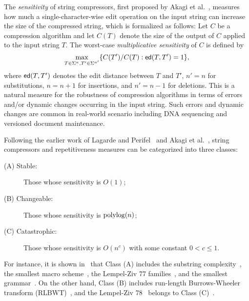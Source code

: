 The \emph{sensitivity} of string compressors,
first proposed by Akagi et al.~\cite{AkagiFI2023},
measures how much a single-character-wise edit operation on the input string
can increase the size of the compressed string,
which is formalized as follows:
Let $C$ be a compression algorithm and let $C(T)$ denote
the size of the output of $C$ applied to the input string $T$.
The worst-case \emph{multiplicative sensitivity} of $C$ 
is defined by
$$\max_{T \in \Sigma^n, T' \in \Sigma^{n'}} \{C(T')/C(T) : \mathsf{ed}(T, T') = 1\},$$
where $\mathsf{ed}(T, T')$ denotes the edit distance between $T$ and $T'$,
$n' = n$ for substitutions, $n = n+1$ for insertions,
and $n' = n-1$ for deletions.
This is a natural measure for the robustness of compression algorithms
in terms of errors and/or dynamic changes occurring in the input string.
Such errors and dynamic changes are common in real-world scenario including
DNA sequencing and versioned document maintenance.

Following the earlier work of Lagarde and Perifel~\cite{LagardeP18}
and Akagi et al.~\cite{AkagiFI2023},
string compressors and repetitiveness measures can be categorized into three classes:
\begin{description}
  \item[(A) Stable:] Those whose sensitivity is $O(1)$;
  \item[(B) Changeable:] Those whose sensitivity is $\mathrm{polylog}(n)$;
  \item[(C) Catastrophic:] Those whose sensitivity is $O(n^c)$ with some constant $0 < c \leq 1$.
    
\end{description}
For instance, it is shown in~\cite{AkagiFI2023} that
Class (A) includes
the substring complexity~\cite{KociumakaNP23},
the smallest macro scheme~\cite{StorerS82},
the Lempel-Ziv 77 families~\cite{LZ77,StorerS82},
and the smallest grammar~\cite{Rytter03,CharikarLLPPSS05}.
On the other hand, 
Class (B) includes run-length Burrows-Wheeler transform (RLBWT)~\cite{AkagiFI2023,GiulianiILPST21,GiulianiILRSU23},
and the Lempel-Ziv 78~\cite{LZ78} belongs to Class (C)~\cite{LagardeP18}.

